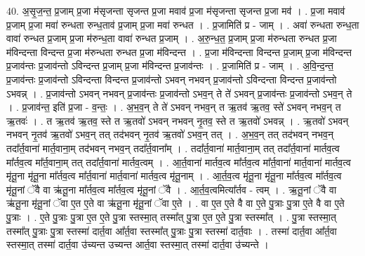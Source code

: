 \documentclass[17pt]{extarticle}
\begin{document}
40. अ॒सृ॒ज॒न्त॒ प्र॒जाम् प्र॒जा म॑सृजन्ता सृजन्त प्र॒जा मवाव॑ प्र॒जा म॑सृजन्ता सृजन्त प्र॒जा मव॑ । . प्र॒जा मवाव॑ प्र॒जाम् प्र॒जा मवा॑ रुन्धता रुन्ध॒ताव॑ प्र॒जाम् प्र॒जा मवा॑ रुन्धत । . प्र॒जामिति॑ प्र - जाम् । . अवा॑ रुन्धता रुन्ध॒ता वावा॑ रुन्धत प्र॒जाम् प्र॒जा म॑रुन्ध॒ता वावा॑ रुन्धत प्र॒जाम् । . अ॒रु॒न्ध॒त॒ प्र॒जाम् प्र॒जा म॑रुन्धता रुन्धत प्र॒जा म॑विन्दन्ता विन्दन्त प्र॒जा म॑रुन्धता रुन्धत प्र॒जा म॑विन्दन्त । . प्र॒जा म॑विन्दन्ता विन्दन्त प्र॒जाम् प्र॒जा म॑विन्दन्त प्र॒जाव॑न्तः प्र॒जाव॑न्तो ऽविन्दन्त प्र॒जाम् प्र॒जा म॑विन्दन्त प्र॒जाव॑न्तः । . प्र॒जामिति॑ प्र - जाम् । . अ॒वि॒न्द॒न्त॒ प्र॒जाव॑न्तः प्र॒जाव॑न्तो ऽविन्दन्ता विन्दन्त प्र॒जाव॑न्तो ऽभवन् नभवन् प्र॒जाव॑न्तो ऽविन्दन्ता विन्दन्त प्र॒जाव॑न्तो ऽभवन्न् । . प्र॒जाव॑न्तो ऽभवन् नभवन् प्र॒जाव॑न्तः प्र॒जाव॑न्तो ऽभव॒न् ते ते॑ ऽभवन् प्र॒जाव॑न्तः प्र॒जाव॑न्तो ऽभव॒न् ते । . प्र॒जाव॑न्त॒ इति॑ प्र॒जा - व॒न्तः॒ । . अ॒भ॒व॒न् ते ते॑ ऽभवन् नभव॒न् त ऋ॒तव॑ ऋ॒तव॒ स्ते॑ ऽभवन् नभव॒न् त ऋ॒तवः॑ । . त ऋ॒तव॑ ऋ॒तव॒ स्ते त ऋ॒तवो॑ ऽभवन् नभवन् नृ॒तव॒ स्ते त ऋ॒तवो॑ ऽभवन्न् । . ऋ॒तवो॑ ऽभवन् नभवन् नृ॒तव॑ ऋ॒तवो॑ ऽभव॒न् तत् तद॑भवन् नृ॒तव॑ ऋ॒तवो॑ ऽभव॒न् तत् । . अ॒भ॒व॒न् तत् तद॑भवन् नभव॒न् तदा᳚र्त॒वाना॑ मार्त॒वाना॒म् तद॑भवन् नभव॒न् तदा᳚र्त॒वाना᳚म् । . तदा᳚र्त॒वाना॑ मार्त॒वाना॒म् तत् तदा᳚र्त॒वाना॑ मार्तव॒त्व मा᳚र्तव॒त्व मा᳚र्त॒वाना॒म् तत् तदा᳚र्त॒वाना॑ मार्तव॒त्वम् । . आ॒र्त॒वाना॑ मार्तव॒त्व मा᳚र्तव॒त्व मा᳚र्त॒वाना॑ मार्त॒वाना॑ मार्तव॒त्व मृ॑तू॒ना मृ॑तू॒ना मा᳚र्तव॒त्व मा᳚र्त॒वाना॑ मार्त॒वाना॑ मार्तव॒त्व मृ॑तू॒नाम् । . आ॒र्त॒व॒त्व मृ॑तू॒ना मृ॑तू॒ना मा᳚र्तव॒त्व मा᳚र्तव॒त्व मृ॑तू॒नां ॅवै वा ऋ॑तू॒ना मा᳚र्तव॒त्व मा᳚र्तव॒त्व मृ॑तू॒नां ॅवै । . आ॒र्त॒व॒त्वमित्या᳚र्तव - त्वम् । . ऋ॒तू॒नां ॅवै वा ऋ॑तू॒ना मृ॑तू॒नां ॅवा ए॒त ए॒ते वा ऋ॑तू॒ना मृ॑तू॒नां ॅवा ए॒ते । . वा ए॒त ए॒ते वै वा ए॒ते पु॒त्राः पु॒त्रा ए॒ते वै वा ए॒ते पु॒त्राः । . ए॒ते पु॒त्राः पु॒त्रा ए॒त ए॒ते पु॒त्रा स्तस्मा॒त् तस्मा᳚त् पु॒त्रा ए॒त ए॒ते पु॒त्रा स्तस्मा᳚त् । . पु॒त्रा स्तस्मा॒त् तस्मा᳚त् पु॒त्राः पु॒त्रा स्तस्मा॑ दार्त॒वा आ᳚र्त॒वा स्तस्मा᳚त् पु॒त्राः पु॒त्रा स्तस्मा॑ दार्त॒वाः । . तस्मा॑ दार्त॒वा आ᳚र्त॒वा स्तस्मा॒त् तस्मा॑ दार्त॒वा उ॑च्यन्त उच्यन्त आर्त॒वा स्तस्मा॒त् तस्मा॑ दार्त॒वा उ॑च्यन्ते । \newline
\pagebreak
{}
\end{document}

